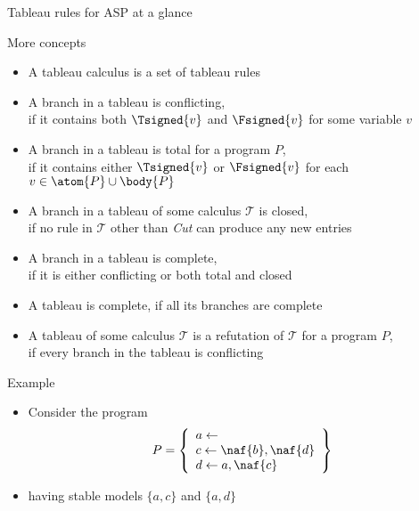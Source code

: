 \begin{frame}{Tableau rules for ASP at a glance}
  \vspace*{-5mm}
  
\end{frame}
\begin{frame}[c]{More concepts}
  \begin{itemize}
  \item <1-> A \alert{tableau calculus} is a set of tableau rules
  \item <2-> A branch in a tableau is \alert{conflicting},\\
    if it contains both $\Tsigned{v}$ and $\Fsigned{v}$ for some variable $v$
  \item <3-> A branch in a tableau is \alert{total} for a program $P$,\\
    if it contains either $\Tsigned{v}$ or $\Fsigned{v}$ for each $v \in \atom{P} \cup \body{P}$
  \item <4-> A branch in a tableau of some calculus $\mathcal{T}$ is \alert{closed},\\
    if no rule in $\mathcal{T}$ other than \textit{Cut} can produce any new entries
  \item <5-> A branch in a tableau is \alert{complete},\\
    if it is either conflicting or both total and closed
  \item <6-> A tableau is \alert{complete}, if all its branches are complete
  \item <7-> A tableau of some calculus $\mathcal{T}$ is a \alert{refutation} of $\mathcal{T}$ for a program $P$,\\
    if every branch in the tableau is conflicting
  \end{itemize}
\end{frame}
\begin{frame}{Example}
  \begin{itemize}
  \item Consider the program
    \[
    P
    =
    \left\{
      \begin{array}{l}
        a\leftarrow\\
        c\leftarrow \naf{b}, \naf{d}\\
        d\leftarrow a, \naf{c}
      \end{array}
    \right\}
    \]
  \item [] having stable models $\{a,c\}$ and $\{a,d\}$
  \end{itemize}
\end{frame}
